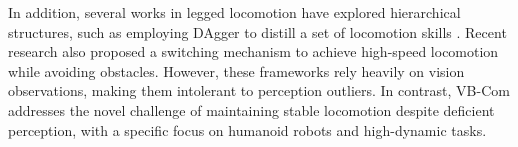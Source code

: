 In addition, several works in legged locomotion have explored hierarchical structures, such as employing DAgger to distill a set of locomotion skills \cite{zhuang2023robot}. Recent research \cite{he2024agile} also proposed a switching mechanism to achieve high-speed locomotion while avoiding obstacles. However, these frameworks rely heavily on vision observations, making them intolerant to perception outliers. In contrast, VB-Com addresses the novel challenge of maintaining stable locomotion despite deficient perception, with a specific focus on humanoid robots and high-dynamic tasks.